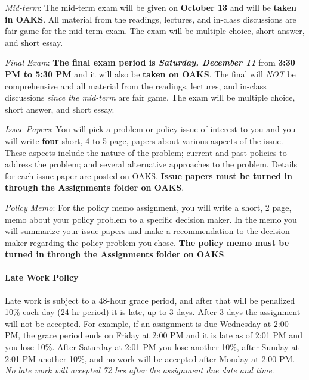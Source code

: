 \vspace{0.1in}

\noindent \emph{Mid-term}: The mid-term exam will be given on
\textbf{October 13} and will be \textbf{taken in OAKS}. All material
from the readings, lectures, and in-class discussions are fair game for
the mid-term exam. The exam will be multiple choice, short answer, and
short essay.

\vspace{0.1in}

\noindent \emph{Final Exam}: \textbf{The final exam period is
\emph{Saturday, December 11}} from \textbf{3:30 PM to 5:30 PM} and it
will also be \textbf{taken on OAKS}. The final will \emph{NOT} be
comprehensive and all material from the readings, lectures, and in-class
discussions \emph{since the mid-term} are fair game. The exam will be
multiple choice, short answer, and short essay.

\vspace{0.1in}

\noindent \emph{Issue Papers}: You will pick a problem or policy issue
of interest to you and you will write \textbf{four} short, 4 to 5 page,
papers about various aspects of the issue. These aspects include the
nature of the problem; current and past policies to address the problem;
and several alternative approaches to the problem. Details for each
issue paper are posted on OAKS. \textbf{Issue papers must be turned in
through the Assignments folder on OAKS}.

\vspace{0.1in}

\noindent \emph{Policy Memo}: For the policy memo assignment, you will
write a short, 2 page, memo about your policy problem to a specific
decision maker. In the memo you will summarize your issue papers and
make a recommendation to the decision maker regarding the policy problem
you chose. \textbf{The policy memo must be turned in through the
Assignments folder on OAKS}.

\hypertarget{late-work-policy}{%
\paragraph{Late Work Policy}\label{late-work-policy}}

Late work is subject to a 48-hour grace period, and after that will be
penalized 10\% each day (24 hr period) it is late, up to 3 days. After 3
days the assignment will not be accepted. For example, if an assignment
is due Wednesday at 2:00 PM, the grace period ends on Friday at 2:00 PM
and it is late as of 2:01 PM and you lose 10\%. After Saturday at 2:01
PM you lose another 10\%, after Sunday at 2:01 PM another 10\%, and no
work will be accepted after Monday at 2:00 PM. \emph{No late work will
accepted 72 hrs after the assignment due date and time}.

